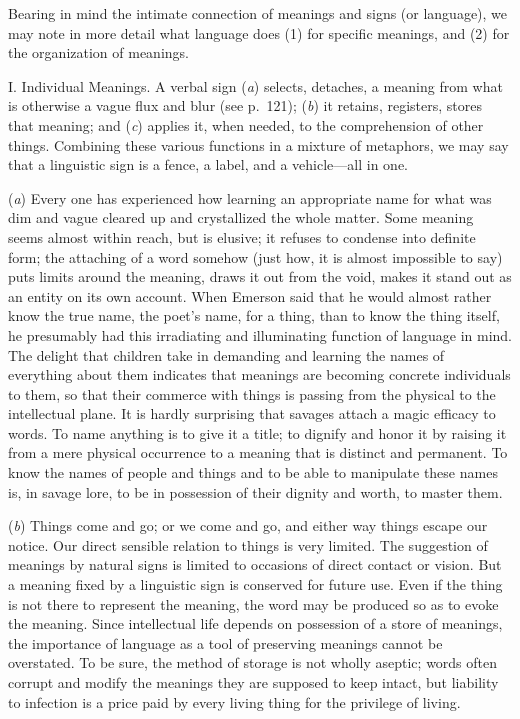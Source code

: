 \documentclass[showtrims,ustradepaper]{memoir}
\begin{document}
Bearing in mind the intimate connection of meanings and signs (or
language), we may note in more detail what language does (1) for
specific meanings, and (2) for the organization of meanings.

I. Individual Meanings. A verbal sign (\emph{a}) selects, detaches, a
meaning from what is otherwise a vague flux and blur (see p.\ 121);
(\emph{b}) it retains, registers, stores that meaning; and (\emph{c})
applies it, when needed, to the comprehension of other things. Combining
these various functions in a mixture of metaphors, we may say that a
linguistic sign is a fence, a label, and a vehicle---all in one.


(\emph{a}) Every one has experienced how learning an appropriate name
for what was dim and vague cleared up and crystallized the whole matter.
Some meaning seems almost within reach, but is elusive; it refuses to
condense into definite form; the attaching of a word somehow (just how,
it is almost impossible to say) puts limits around the meaning, draws it
out from the void, makes it stand out as an entity on its own account.
When Emerson said that he would almost rather know the true name, the
poet's name, for a thing, than to know the thing itself, he presumably
had this irradiating and illuminating function of language in mind. The
delight that children take in demanding and learning the names of
everything about them indicates that meanings are becoming concrete
individuals to them, so that their commerce with things is passing from
the physical to the intellectual plane. It is hardly surprising that
savages attach a magic efficacy to words. To name anything is to give it
a title; to dignify and honor it
by
raising it from a mere physical occurrence to a meaning that is distinct
and permanent. To know the names of people and things and to be able to
manipulate these names is, in savage lore, to be in possession of their
dignity and worth, to master them.


(\emph{b}) Things come and go; or we come and go, and either way things
escape our notice. Our direct sensible relation to things is very
limited. The suggestion of meanings by natural signs is limited to
occasions of direct contact or vision. But a meaning fixed by a
linguistic sign is conserved for future use. Even if the thing is not
there to represent the meaning, the word may be produced so as to evoke
the meaning. Since intellectual life depends on possession of a store of
meanings, the importance of language as a tool of preserving meanings
cannot be overstated. To be sure, the method of storage is not wholly
aseptic; words often corrupt and modify the meanings they are supposed
to keep intact, but liability to infection is a price paid by every
living thing for the privilege of living.
\end{document}
